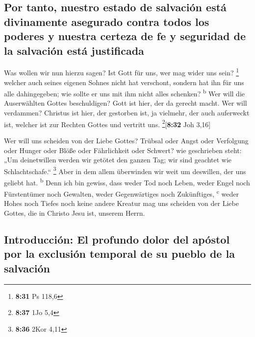 \hypertarget{por-tanto-nuestro-estado-de-salvaciuxf3n-estuxe1-divinamente-asegurado-contra-todos-los-poderes-y-nuestra-certeza-de-fe-y-seguridad-de-la-salvaciuxf3n-estuxe1-justificada}{%
\subsection{Por tanto, nuestro estado de salvación está divinamente
asegurado contra todos los poderes y nuestra certeza de fe y seguridad
de la salvación está
justificada}\label{por-tanto-nuestro-estado-de-salvaciuxf3n-estuxe1-divinamente-asegurado-contra-todos-los-poderes-y-nuestra-certeza-de-fe-y-seguridad-de-la-salvaciuxf3n-estuxe1-justificada}}

 Was wollen wir nun hierzu sagen? Ist Gott für uns, wer
mag wider uns sein? \footnote{\textbf{8:31} Ps 118,6} 
welcher auch seines eigenen Sohnes nicht hat verschont, sondern hat ihn
für uns alle dahingegeben; wie sollte er uns mit ihm nicht alles
schenken? \textsuperscript{b}  Wer will die Auserwählten
Gottes beschuldigen? Gott ist hier, der da gerecht macht.
 Wer will verdammen? Christus ist hier, der gestorben
ist, ja vielmehr, der auch auferweckt ist, welcher ist zur Rechten
Gottes und vertritt uns. \footnote{\textbf{8:37} 1Jo 5,4}{[}\textbf{8:32}
Joh 3,16{]}

 Wer will uns scheiden von der Liebe Gottes? Trübsal oder
Angst oder Verfolgung oder Hunger oder Blöße oder Fährlichkeit oder
Schwert?  wie geschrieben steht: „Um deinetwillen werden
wir getötet den ganzen Tag; wir sind geachtet wie Schlachtschafe.``
\footnote{\textbf{8:36} 2Kor 4,11}  Aber in dem allem
überwinden wir weit um deswillen, der uns geliebt hat.
\textsuperscript{b}  Denn ich bin gewiss, dass weder Tod
noch Leben, weder Engel noch Fürstentümer noch Gewalten, weder
Gegenwärtiges noch Zukünftiges, \textsuperscript{c} 
weder Hohes noch Tiefes noch keine andere Kreatur mag uns scheiden von
der Liebe Gottes, die in Christo Jesu ist, unserem Herrn.

\hypertarget{introducciuxf3n-el-profundo-dolor-del-apuxf3stol-por-la-exclusiuxf3n-temporal-de-su-pueblo-de-la-salvaciuxf3n}{%
\subsection{Introducción: El profundo dolor del apóstol por la exclusión
temporal de su pueblo de la
salvación}\label{introducciuxf3n-el-profundo-dolor-del-apuxf3stol-por-la-exclusiuxf3n-temporal-de-su-pueblo-de-la-salvaciuxf3n}}

